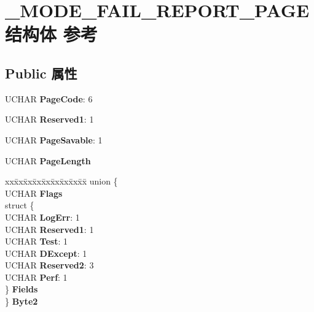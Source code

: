 \hypertarget{struct___m_o_d_e___f_a_i_l___r_e_p_o_r_t___p_a_g_e}{}\section{\+\_\+\+M\+O\+D\+E\+\_\+\+F\+A\+I\+L\+\_\+\+R\+E\+P\+O\+R\+T\+\_\+\+P\+A\+G\+E结构体 参考}
\label{struct___m_o_d_e___f_a_i_l___r_e_p_o_r_t___p_a_g_e}
\subsection*{Public 属性}
\begin{DoxyCompactItemize}
\item 
\mbox{\label{struct___m_o_d_e___f_a_i_l___r_e_p_o_r_t___p_a_g_e_a07dd2aba90232467aba4d97252dd3afe}} 
U\+C\+H\+AR {\bfseries Page\+Code}\+: 6
\item 
\mbox{\label{struct___m_o_d_e___f_a_i_l___r_e_p_o_r_t___p_a_g_e_ad1a67ff2eebc632999e6361f5df84098}} 
U\+C\+H\+AR {\bfseries Reserved1}\+: 1
\item 
\mbox{\label{struct___m_o_d_e___f_a_i_l___r_e_p_o_r_t___p_a_g_e_a80078563916d7877e2692b68d264e81a}} 
U\+C\+H\+AR {\bfseries Page\+Savable}\+: 1
\item 
\mbox{\label{struct___m_o_d_e___f_a_i_l___r_e_p_o_r_t___p_a_g_e_a9f68c35b9e670975fffabcbd99b4799d}} 
U\+C\+H\+AR {\bfseries Page\+Length}
\item 
\mbox{\label{struct___m_o_d_e___f_a_i_l___r_e_p_o_r_t___p_a_g_e_a9dc30c3347060d201e66cbde75a5f878}} 
\begin{tabbing}
xx\=xx\=xx\=xx\=xx\=xx\=xx\=xx\=xx\=\kill
union \{\\
\>UCHAR {\bfseries Flags}\\
\>struct \{\\
\>\>UCHAR {\bfseries LogErr}: 1\\
\>\>UCHAR {\bfseries Reserved1}: 1\\
\>\>UCHAR {\bfseries Test}: 1\\
\>\>UCHAR {\bfseries DExcept}: 1\\
\>\>UCHAR {\bfseries Reserved2}: 3\\
\>\>UCHAR {\bfseries Perf}: 1\\
\>\} {\bfseries Fields}\\
\} {\bfseries Byte2}\\


\end{tabbing}
\end{DoxyCompactItemize}

